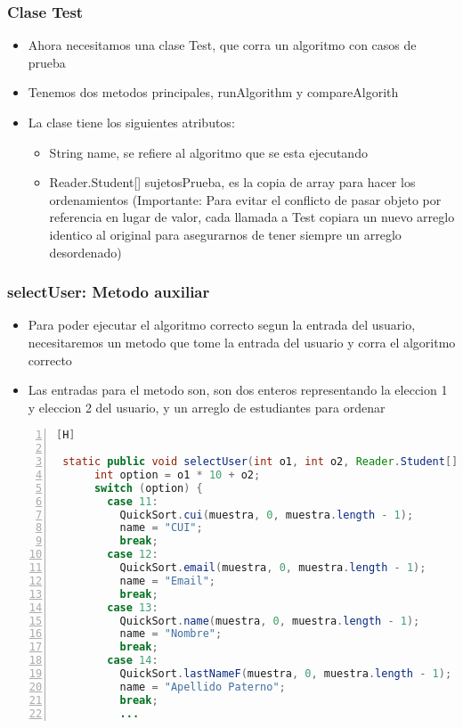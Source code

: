 \subsubsection{Clase Test}
\begin{itemize}
  \item Ahora necesitamos una clase Test, que corra un algoritmo con casos de prueba
  \item Tenemos dos metodos principales, runAlgorithm y compareAlgorith
  \item La clase tiene los siguientes atributos:
  \begin{itemize}
    \item String name, se refiere al algoritmo que se esta ejecutando
    \item Reader.Student[] sujetosPrueba, es la copia de array para hacer los ordenamientos (Importante: Para evitar el conflicto de pasar objeto por referencia en lugar de valor, cada llamada a Test copiara un nuevo arreglo identico al original para asegurarnos de tener siempre un arreglo desordenado)
  \end{itemize}
\end{itemize}
\subsubsection{selectUser: Metodo auxiliar}
\begin{itemize}
  \item Para poder ejecutar el algoritmo correcto segun la entrada del usuario, necesitaremos un metodo que tome la entrada del usuario y corra el algoritmo correcto
  \item Las entradas para el metodo son, son dos enteros representando la eleccion 1 y eleccion 2 del usuario, y un arreglo de estudiantes para ordenar
\end{itemize}


\begin{lstlisting}[language=java, caption={Metodo auxiliar}, numbers=left, firstnumber=1][H]

 static public void selectUser(int o1, int o2, Reader.Student[] muestra){
      int option = o1 * 10 + o2;
      switch (option) {
        case 11:
          QuickSort.cui(muestra, 0, muestra.length - 1);
          name = "CUI";
          break;
        case 12:
          QuickSort.email(muestra, 0, muestra.length - 1);
          name = "Email";
          break;
        case 13:
          QuickSort.name(muestra, 0, muestra.length - 1);
          name = "Nombre";
          break;
        case 14:
          QuickSort.lastNameF(muestra, 0, muestra.length - 1);
          name = "Apellido Paterno";
          break;
          ...
\end{lstlisting}
